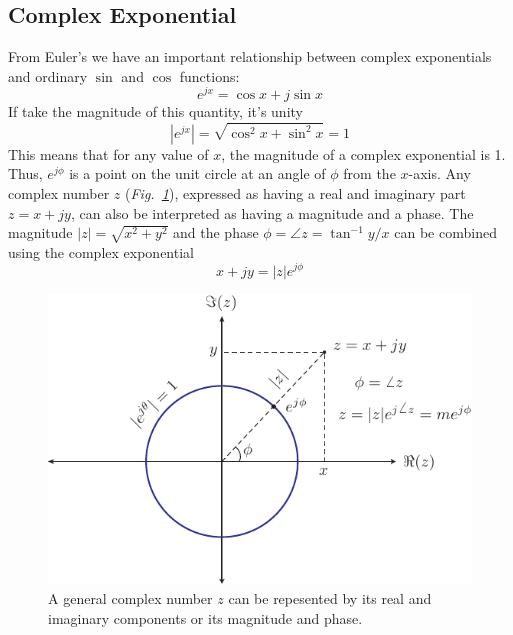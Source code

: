 \subsection{Complex Exponential}
From Euler's we have an important relationship between complex exponentials and ordinary $\sin$ and $\cos$ functions:
    \begin{equation}
        e^{j x} = \cos x + j \sin x
    \end{equation}
If take the magnitude of this quantity, it's unity
    \begin{equation}
        | e^{j x} | = \sqrt{\cos^2 x +  \sin^2 x}  = 1
    \end{equation}
This means that for any value of $x$, the magnitude of a complex exponential is 1.  Thus,  $e^{j\phi}$ is a point on the unit circle at an angle of $\phi$ from the $x$-axis. 
Any complex number $z$ (\emph{Fig.~\ref{fig:complex}}), expressed as having a real and imaginary part $ z = x + j y$, can also be interpreted as having a magnitude and a phase.  The magnitude  $|z| = \sqrt{x^2 + y^2}$ and the phase $\phi = \angle z = \tan^{-1} y/x$ can be combined using the complex exponential
    \begin{equation}
        x + j y = |z| e^{j\phi}
    \end{equation}
\begin{figure}[tb]
\centering
\includegraphics[width=.6\columnwidth]{complex}
\caption{A general complex number $z$ can be repesented by its real and imaginary components or its magnitude and phase. } \label{fig:complex}
\end{figure}
